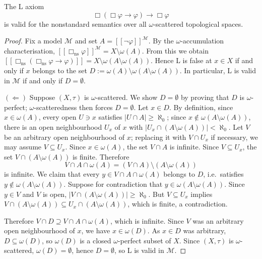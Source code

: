\documentclass[10pt,a4paper]{amsart}
\newcommand{\sem}[1]{[\![#1]\!]}
\newcommand{\sq}{\Box}
\begin{document}
\begin{lemma}
\label{thm:GLchar}
The \textup{L}  axiom
\[
  \sq(\sq\varphi \to \varphi)
  \to
  \sq\varphi
\]
is valid for the nonstandard semantics over all $\omega$-scattered topological spaces.
\end{lemma}

\begin{proof}
Fix a model $\mathcal{M}$ and set $A = \sem{\neg\varphi}^{\mathcal{M}}$.
By the $\omega$-accumulation characterisation,  
$\sem{\sq_\mathrm{ns}\varphi}^{\mathcal{M}} = X \setminus \omega(A)$.
From this we obtain $ \sem{\sq_\mathrm{ns}(\sq_\mathrm{ns}\varphi \to \varphi)}
  = X \setminus \omega(A \setminus \omega(A))$.
Hence L is false at $x \in X$ if and only if $x$ belongs to the set $D := \omega(A) \setminus \omega(A \setminus \omega(A))$.
In particular, L is valid in $\mathcal{M}$ if and only if $D = \emptyset$.

\medskip
$(\Leftarrow)$
Suppose $(X,\tau)$ is $\omega$-scattered. We show $D = \emptyset$ by proving that $D$ is $\omega$-perfect; $\omega$-scatteredness then forces $D = \emptyset$.
Let $x \in D$. 
By definition, since $x \in \omega(A)$, every open $U\ni x$ satisfies
    $|U \cap A| \geq \aleph_0$; since $x \notin \omega(A \setminus \omega(A))$, there is an open
    neighbourhood $U_x$ of $x$ with
    $\bigl|U_x \cap (A \setminus \omega(A))\bigr| < \aleph_0$.
Let $V$ be an arbitrary open neighbourhood of $x$; replacing it with $V \cap U_x$ if necessary, we may assume $V \subseteq U_x$.
Since $x \in \omega(A)$, the set $V \cap A$ is infinite.
Since $V \subseteq U_x$, the set $V \cap (A \setminus \omega(A))$ is finite.
Therefore
\[
  V \cap A \cap \omega(A)
  = (V \cap A) \setminus (A \setminus \omega(A))
\]
is infinite.
We claim that every $y \in V \cap A \cap \omega(A)$ belongs to $D$, i.e.\
satisfies $y \notin \omega(A \setminus \omega(A))$.
Suppose for contradiction that $y \in \omega(A \setminus \omega(A))$.
Since $y \in V$ and $V$ is open, $\bigl|V \cap (A \setminus \omega(A))\bigr| \geq \aleph_0$.
But $V \subseteq U_x$ implies
$V \cap (A \setminus \omega(A)) \subseteq U_x \cap (A \setminus \omega(A))$,
which is finite, a contradiction.

Therefore $V \cap D \supseteq V \cap A \cap \omega(A)$, which is infinite.
Since $V$ was an arbitrary open neighbourhood of $x$, we have $x \in \omega(D)$.
As $x \in D$ was arbitrary, $D \subseteq \omega(D)$, so $\omega(D)$ is a closed $\omega$-perfect subset of $X$.
Since $(X,\tau)$ is $\omega$-scattered, $\omega(D) = \emptyset$, hence $D = \emptyset$, so L is valid in $\mathcal{M}$.



\end{proof}
\end{document}
